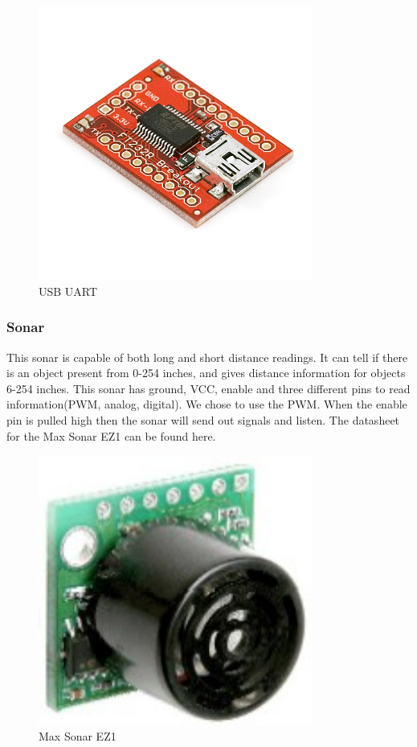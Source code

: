 \begin{figure}[h]
  \begin{center}
    \includegraphics[width=90mm]{imageSources/usbUART.png}
  \end{center}
  \caption{USB UART} 
  \label{usbUART}
\end{figure}

\subsubsection{Sonar}
This sonar is capable of both long and short distance readings. It can tell if there is an object present from 0-254 inches, and gives distance information for objects 6-254 inches. This sonar has ground, VCC, enable and three different pins to read information(PWM, analog, digital). We chose to use the PWM.  When the enable pin is pulled high then the sonar will send out signals and listen.  The datasheet for the Max Sonar EZ1 can be found here.
\begin{figure}[h]
  \begin{center}
    \includegraphics[width=90mm]{imageSources/sonar.png}
  \end{center}
  \caption{Max Sonar EZ1} 
  \label{sonar}
\end{figure}

